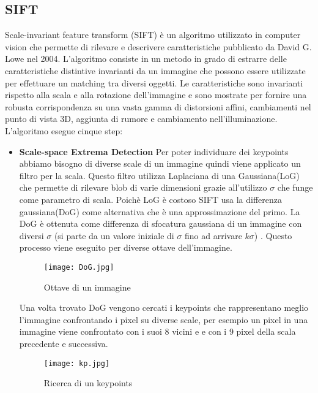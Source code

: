 \subsection{SIFT}
Scale-invariant feature transform (SIFT) è un algoritmo utilizzato in computer vision che permette di rilevare e descrivere caratteristiche pubblicato da David G. Lowe nel 2004.
L'algoritmo consiste in un metodo in grado di estrarre delle caratteristiche distintive invarianti da un immagine che possono essere utilizzate per effettuare un matching tra diversi oggetti. Le caratteristiche sono invarianti rispetto alla scala e alla rotazione dell'immagine e sono mostrate per fornire una robusta corrispondenza su una vasta gamma di distorsioni affini, cambiamenti nel punto di vista 3D, aggiunta di rumore e cambiamento nell'illuminazione. L'algoritmo esegue cinque step:
\begin{itemize}
\item \textbf{Scale-space Extrema Detection}
Per poter individuare dei keypoints abbiamo bisogno di diverse scale di un immagine quindi viene applicato un filtro per la scala. Questo filtro utilizza Laplaciana di una Gaussiana(LoG) che permette di rilevare blob di varie dimensioni grazie all'utilizzo $\sigma$ che funge come parametro di scala. Poichè LoG è costoso SIFT usa la differenza gaussiana(DoG) come alternativa che è una approssimazione del primo. La DoG è ottenuta come differenza di sfocatura gaussiana di un immagine con diversi $\sigma$ (si parte da un valore iniziale di $\sigma$ fino ad arrivare $k\sigma$) . Questo processo viene eseguito per diverse ottave dell'immagine.

\begin{figure}[!h]
	\begin{center}
    \texttt{[image: DoG.jpg]}
    \caption{Ottave di un immagine}
    \label{fig:DoG}
    	\end{center}
\end{figure}

Una volta trovato DoG vengono cercati i keypoints che rappresentano meglio l'immagine confrontando i pixel su diverse scale, per esempio un pixel in una immagine viene confrontato con i suoi 8 vicini e e con i 9 pixel della scala precedente e successiva.

\begin{figure}[!h]
  \begin{center}
    \texttt{[image: kp.jpg]}
    \caption{Ricerca di un keypoints}
    \label{fig:kp}
    	\end{center}
\end{figure}


\end{itemize}
